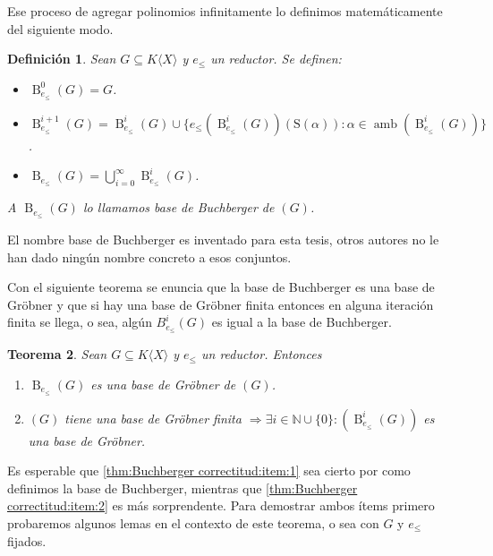 \documentclass[12pt]{report}
\theoremstyle{customstyle}
\newtheorem{theorem}{Teorema}[chapter]
\newtheorem{definition}[theorem]{Definición}
\theoremstyle{factstyle}
\DeclareMathOperator{\amb}{amb}
\renewcommand{\S}{\text{S}}
\DeclareMathOperator{\B}{B}
\begin{document}
Ese proceso de agregar polinomios infinitamente lo definimos matemáticamente del siguiente modo.

\begin{definition}
  Sean $G ⊆ K⟨X⟩$ y $e_≤$ un reductor. Se definen:
  \begin{itemize}
    \item $\B_{e_≤}^0(G) = G$.
    \item $\B_{e_≤}^{i + 1}(G) = \B_{e_≤}^i(G) ∪ \{e_≤(\B_{e_≤}^i(G))(\S(α)) : α ∈ \amb(\B_{e_≤}^i(G))\}$.
    \item $\B_{e_≤}(G) = ⋃_{i = 0}^∞ \B_{e_≤}^i(G)$.
  \end{itemize}
  A $\B_{e_≤}(G)$ lo llamamos base de Buchberger de $(G)$.
\end{definition}

El nombre base de Buchberger es inventado para esta tesis, otros autores no le han dado ningún nombre concreto a esos conjuntos.

Con el siguiente teorema se enuncia que la base de Buchberger es una base de Gröbner y que si hay una base de Gröbner finita entonces en alguna iteración finita se llega, o sea, algún $B_{e_≤}^{i}(G)$ es igual a la base de Buchberger.

\begin{theorem}\label{thm:Buchberger correctitud}
  Sean $G ⊆ K⟨X⟩$ y $e_≤$ un reductor. Entonces
  \begin{enumerate}
    \item $\B_{e_≤}(G)$ es una base de Gröbner de $(G)$. \label{thm:Buchberger correctitud:item:1}
    \item $(G)$ tiene una base de Gröbner finita $⇒ ∃i ∈ ℕ ∪ \{0\} : (\B_{e_≤}^i(G))$ es una base de Gröbner. \label{thm:Buchberger correctitud:item:2}
  \end{enumerate}
\end{theorem}

Es esperable que \ref{thm:Buchberger correctitud:item:1} sea cierto por como definimos la base de Buchberger, mientras que \ref{thm:Buchberger correctitud:item:2} es más sorprendente. Para demostrar ambos ítems primero probaremos algunos lemas en el contexto de este teorema, o sea con $G$ y $e_≤$ fijados.
\end{document}
